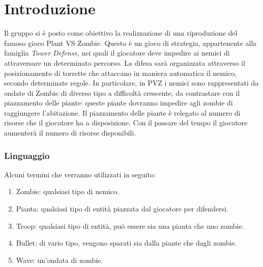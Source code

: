 \section*{Introduzione}
Il gruppo si è posto come obiettivo la realizzazione di una riproduzione del famoso gioco Plant VS Zombie.
Questo è un gioco di strategia, appartenente alla famiglia \textit{Tower Defense}, nei quali il giocatore
deve impedire ai nemici di attraversare un determinato percorso. La difesa sarà organizzata attraverso il posizionamento di torrette che attaccano in maniera automatica il nemico, secondo determinate regole.
In particolare, in PVZ i nemici sono rappresentati da ondate di Zombie di diverso tipo a difficoltà crescente,
da contrastare con il piazzamento delle piante: queste piante dovranno impedire agli zombie di raggiungere l'abitazione.
Il piazzamento delle piante è relegato al numero di risorse che il giocatore ha a disposizione.
Con il passare del tempo il giocatore aumenterà il numero di risorse disponibili.

\subsubsection{Linguaggio}
Alcuni termini che verranno utilizzati in seguito:
\begin{enumerate}
    \item Zombie: qualsiasi tipo di nemico.
    \item Pianta: qualsiasi tipo di entità piazzata dal giocatore per difendersi.
    \item Troop: qualsiasi tipo di entità, può essere sia una pianta che uno zombie.
    \item Bullet: di vario tipo, vengono sparati sia dalla piante che dagli zombie.
    \item Wave: un'ondata di zombie.
\end{enumerate}
